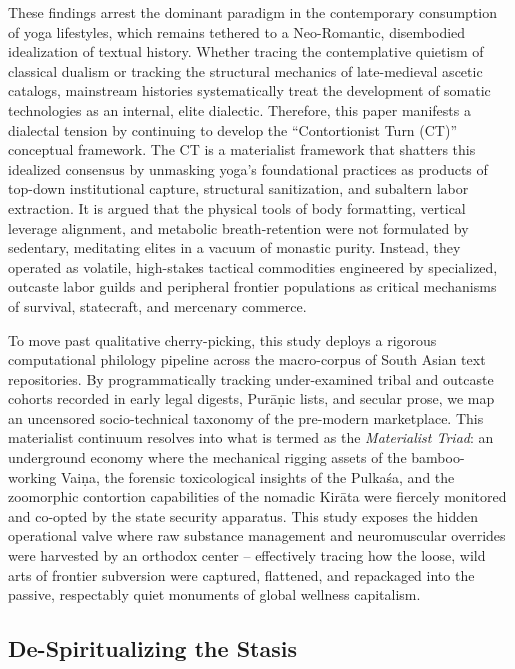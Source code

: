 \documentclass[11pt,twoside,letterpaper]{article}
\begin{document}
These findings arrest the dominant paradigm in the contemporary consumption of yoga lifestyles, which remains tethered to a Neo-Romantic, disembodied idealization of textual history. Whether tracing the contemplative quietism of classical dualism or tracking the structural mechanics of late-medieval ascetic catalogs, mainstream histories systematically treat the development of somatic technologies as an internal, elite dialectic. Therefore, this paper manifests a dialectal tension by continuing to develop the ``Contortionist Turn (CT)'' conceptual framework. The CT is a materialist framework that shatters this idealized consensus by unmasking yoga's foundational practices as products of top-down institutional capture, structural sanitization, and subaltern labor extraction. It is argued that the physical tools of body formatting, vertical leverage alignment, and metabolic breath-retention were not formulated by sedentary, meditating elites in a vacuum of monastic purity. Instead, they operated as volatile, high-stakes tactical commodities engineered by specialized, outcaste labor guilds and peripheral frontier populations as critical mechanisms of survival, statecraft, and mercenary commerce.

To move past qualitative cherry-picking, this study deploys a rigorous computational philology pipeline across the macro-corpus of South Asian text repositories. By programmatically tracking under-examined tribal and outcaste cohorts recorded in early legal digests, Purāṇic lists, and secular prose, we map an uncensored socio-technical taxonomy of the pre-modern marketplace. This materialist continuum resolves into what is termed as the \textit{Materialist Triad}: an underground economy where the mechanical rigging assets of the bamboo-working Vaiṇa, the forensic toxicological insights of the Pulkaśa, and the zoomorphic contortion capabilities of the nomadic Kirāta were fiercely monitored and co-opted by the state security apparatus. This study exposes the hidden operational valve where raw substance management and neuromuscular overrides were harvested by an orthodox center -- effectively tracing how the loose, wild arts of frontier subversion were captured, flattened, and repackaged into the passive, respectably quiet monuments of global wellness capitalism.

\subsection{De-Spiritualizing the Stasis}
\end{document}
